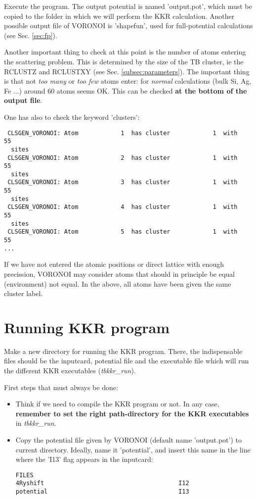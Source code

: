 \documentclass[11pt,fleqn]{book} %
\begin{document}
Execute the program. The output potential is named 'output.pot', which must
be copied to the folder in which we will perform the KKR calculation.
Another possible output file of VORONOI is 'shapefun', used for full-potential
calculations (see Sec. \ref{sec:fp}).


Another important thing to check at this point is the number of atoms entering the scattering problem.
This is determined by the size of the TB cluster,
ie the RCLUSTZ and RCLUSTXY (see Sec. \ref{subsec:parameters}).
The important thing is that not \textit{too many} or \textit{too few} atoms enter: for \textit{normal}
calculations (bulk Si, Ag, Fe ...) around 60 atoms seems OK.
This can be checked \textbf{at the bottom of the output file}.

One has also to check the keyword 'clusters':
\begin{VBox}
{\small{
\begin{verbatim}
 CLSGEN_VORONOI: Atom            1  has cluster            1  with           55
  sites
 CLSGEN_VORONOI: Atom            2  has cluster            1  with           55
  sites
 CLSGEN_VORONOI: Atom            3  has cluster            1  with           55
  sites
 CLSGEN_VORONOI: Atom            4  has cluster            1  with           55
  sites
 CLSGEN_VORONOI: Atom            5  has cluster            1  with           55
...
\end{verbatim}
}}
\end{VBox}
If we have not entered the atomic positions or direct lattice with enough precission,
VORONOI may consider atoms that should in principle be equal (environment)
not equal. In the above, all atoms have been given the same cluster label.

\section{Running KKR program}
\label{sec:run-kkr}

Make a new directory for running the KKR program. There, the indispensable files
should be the inputcard, potential file and the executable file which
will run the different KKR executables (\textit{tbkkr\_run}).

First steps that must always be done:

\begin{itemize}
\item Think if we need to compile the KKR program or not. In any case, \textbf{remember
to set the right path-directory
for the KKR executables} in \textit{tbkkr\_run}.

\item Copy the potential file given by VORONOI
(default name 'output.pot') to current directory. Ideally,
name it 'potential', and insert this name in the line where the 'I13' flag appears
in the inputcard:
\begin{VBox}
\begin{verbatim}
FILES
4Ryshift                                      I12
potential                                     I13
\end{verbatim}
\end{VBox}
\end{itemize}
\end{document}
